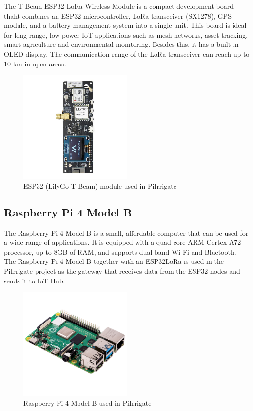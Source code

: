 The T-Beam ESP32 LoRa Wireless Module is a compact development board thaht combines an ESP32 microcontroller,
LoRa transceiver (SX1278), GPS module, and a battery management system into a single unit. This board is ideal
for long-range, low-power IoT applications such as mesh networks, asset tracking, smart agriculture and environmental
monitoring. Besides this, it has a built-in OLED display. The communication range of the LoRa transceiver can reach up to 10 km in open areas.
\begin{figure}[H]
    \centering
    \includegraphics[width=0.5\textwidth]{images/esp32lora.jpg}
    \caption{ESP32 (LilyGo T-Beam) module used in PiIrrigate}
    \label{fig:esp32lora}
\end{figure}

\subsection{Raspberry Pi 4 Model B}
The Raspberry Pi 4 Model B is a small, affordable computer that can be used for a wide range of applications.
It is equipped with a quad-core ARM Cortex-A72 processor, up to 8GB of RAM, and supports dual-band Wi-Fi and Bluetooth.
The Raspberry Pi 4 Model B together with an ESP32LoRa is used in the PiIrrigate project as the gateway that receives data from the ESP32 nodes
and sends it to IoT Hub.
\begin{figure}[H]
    \centering
    \includegraphics[width=0.5\textwidth]{images/raspberrypi.jpg}
    \caption{Raspberry Pi 4 Model B used in PiIrrigate}
    \label{fig:raspberrypi}
\end{figure}


